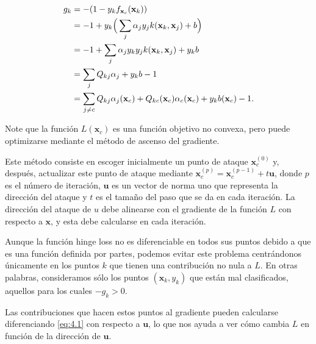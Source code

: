 \documentclass[letterpaper,12pt,oneside]{book}
\begin{document}
{{{{    
\begin{align}
g_k &= -(1 - y_k f_{\mathbf{x}_c} (\mathbf{x}_k)) \notag\\
    &= -1 + y_k \Big(\sum_{j} \alpha_j y_j k(\mathbf{x}_k, \mathbf{x}_j) + b \Big) \notag\\
    &= -1 + \sum_{j} \alpha_j y_k y_j k(\mathbf{x}_k, \mathbf{x}_j) + y_k b \notag\\
    &= \sum_{j} Q_{kj} \alpha_j + y_k b - 1 \label{eq:4.1} \\
    &= \sum_{j \neq c} Q_{kj} \alpha_j(\mathbf{x}_c) + Q_{kc}(\mathbf{x}_c) \alpha_c(\mathbf{x}_c) + y_k b(\mathbf{x}_c) - 1. \notag
\end{align}
    
    
Note que la función \(L(\mathbf{x}_c)\) es una función objetivo no convexa, pero puede optimizarse mediante el método de ascenso del gradiente.

Este método consiste en escoger inicialmente un punto de ataque \(\mathbf{x}_{c}^{(0)}\) y, después, actualizar este punto de ataque mediante \(\mathbf{x}_{c}^{(p)} = \mathbf{x}_{c}^{(p-1)} + t\mathbf{u}\), donde \(p\) es el número de iteración, \(\mathbf{u}\) es un vector de norma uno que representa la dirección del ataque y \(t\) es el tamaño del paso que se da en cada iteración. La dirección del ataque de \(u\) debe alinearse con el gradiente de la función \(L\) con respecto a \(\mathbf{x}\), y esta debe calcularse en cada iteración.

Aunque la función hinge loss no es diferenciable en todos sus puntos debido a que es una función definida por partes, podemos evitar este problema centrándonos únicamente en los puntos \(k\) que tienen una contribución no nula a \(L\). En otras palabras, consideramos sólo los puntos \((\mathbf{x}_k, y_k)\) que están mal clasificados, aquellos para los cuales \(-g_k > 0\).

Las contribuciones que hacen estos puntos al gradiente pueden calcularse diferenciando \eqref{eq:4.1} con respecto a \(\mathbf{u}\), lo que nos ayuda a ver cómo cambia \(L\) en función de la dirección de \(\mathbf{u}\).

    
    
}}}}
\end{document}
